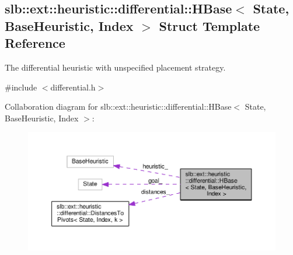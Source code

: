 \hypertarget{structslb_1_1ext_1_1heuristic_1_1differential_1_1HBase}{}\subsection{slb\+:\+:ext\+:\+:heuristic\+:\+:differential\+:\+:H\+Base$<$ State, Base\+Heuristic, Index $>$ Struct Template Reference}
\label{structslb_1_1ext_1_1heuristic_1_1differential_1_1HBase}


The differential heuristic with unspecified placement strategy.  




{\ttfamily \#include $<$differential.\+h$>$}



Collaboration diagram for slb\+:\+:ext\+:\+:heuristic\+:\+:differential\+:\+:H\+Base$<$ State, Base\+Heuristic, Index $>$\+:\nopagebreak
\begin{figure}[H]
\begin{center}
\leavevmode
\includegraphics[width=350pt]{structslb_1_1ext_1_1heuristic_1_1differential_1_1HBase__coll__graph}
\end{center}
\end{figure}
